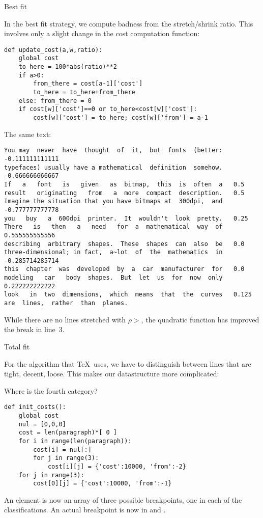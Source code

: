  {Best fit}

In the best fit strategy, we compute badness from the stretch/shrink ratio.
This involves only a slight change in the cost computation function:
\begin{verbatim}
def update_cost(a,w,ratio):
    global cost
    to_here = 100*abs(ratio)**2
    if a>0:
        from_there = cost[a-1]['cost']
        to_here = to_here+from_there
    else: from_there = 0
    if cost[w]['cost']==0 or to_here<cost[w]['cost']:
        cost[w]['cost'] = to_here; cost[w]['from'] = a-1
\end{verbatim}
The same text:
\begin{footnotesize}
\begin{verbatim}
You may  never  have  thought  of  it,  but  fonts  (better:   -0.111111111111
typefaces) usually have a mathematical  definition  somehow.   -0.666666666667
If   a   font   is   given   as  bitmap,  this  is  often  a   0.5
result   originating   from   a  more  compact  description.   0.5
Imagine the situation that you have bitmaps at  300dpi,  and   -0.777777777778
you   buy   a  600dpi  printer.  It  wouldn't  look  pretty.   0.25
There   is   then   a   need   for  a  mathematical  way  of   0.555555555556
describing  arbitrary  shapes.  These  shapes  can  also  be   0.0
three-dimensional; in fact,  a~lot  of  the  mathematics  in   -0.285714285714
this  chapter  was  developed  by  a  car  manufacturer  for   0.0
modeling   car   body  shapes.  But  let  us  for  now  only   0.222222222222
look   in  two  dimensions,  which  means  that  the  curves   0.125
are  lines,  rather  than  planes.
\end{verbatim}
\end{footnotesize}
While there are no lines stretched with $\rho>$, the quadratic
function has improved the break in line~3.

 {Total fit}

For the algorithm that \TeX\ uses, we have to distinguish between
lines that are tight, decent, loose. This makes our datastructure more
complicated:
\begin{problem}
Where is the fourth category?
\end{problem}
\begin{verbatim}
def init_costs():
    global cost
    nul = [0,0,0]
    cost = len(paragraph)*[ 0 ]
    for i in range(len(paragraph)):
        cost[i] = nul[:]
        for j in range(3):
            cost[i][j] = {'cost':10000, 'from':-2}
    for j in range(3):
        cost[0][j] = {'cost':10000, 'from':-1}
\end{verbatim}
An element  is now an array of three possible breakpoints,
one in each of the classifications. An actual breakpoint is now in
 and .

